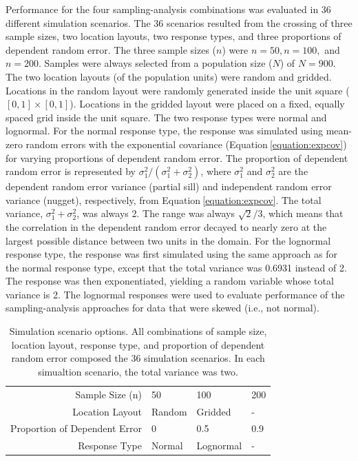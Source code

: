 \documentclass[]{elsarticle} %
\begin{document}
Performance for the four sampling-analysis combinations was evaluated in
36 different simulation scenarios. The 36 scenarios resulted from the
crossing of three sample sizes, two location layouts, two response
types, and three proportions of dependent random error. The three sample
sizes (\(n\)) were \(n = 50, n = 100,\) and \(n = 200\). Samples were
always selected from a population size (\(N\)) of \(N = 900\). The two
location layouts (of the population units) were random and gridded.
Locations in the random layout were randomly generated inside the unit
square (\([0, 1] \times [0, 1]\)). Locations in the gridded layout were
placed on a fixed, equally spaced grid inside the unit square. The two
response types were normal and lognormal. For the normal response type,
the response was simulated using mean-zero random errors with the
exponential covariance (Equation\(~\)\ref{equation:expcov}) for varying
proportions of dependent random error. The proportion of dependent
random error is represented by
\(\sigma^2_1 / (\sigma^2_1 + \sigma^2_2)\), where \(\sigma^2_1\) and
\(\sigma^2_2\) are the dependent random error variance (partial sill)
and independent random error variance (nugget), respectively, from
Equation\(~\)\ref{equation:expcov}. The total variance,
\(\sigma^2_1 + \sigma^2_2\), was always 2. The range was always
\(\sqrt{2} / 3\), which means that the correlation in the dependent
random error decayed to nearly zero at the largest possible distance
between two units in the domain. For the lognormal response type, the
response was first simulated using the same approach as for the normal
response type, except that the total variance was 0.6931 instead of 2.
The response was then exponentiated, yielding a random variable whose
total variance is 2. The lognormal responses were used to evaluate
performance of the sampling-analysis approaches for data that were
skewed (i.e., not normal).

\begin{table}[ht]
\centering
\begin{tabular}{r|lll}
   \hline
Sample Size (n) & 50 & 100 & 200 \\ 
  Location Layout & Random & Gridded & - \\ 
  Proportion of Dependent Error & 0 & 0.5 & 0.9 \\ 
  Response Type & Normal & Lognormal & - \\ 
   \hline
\end{tabular}
\caption{\label{tab:parmtab} Simulation scenario options. All combinations of sample size, location layout, response type, and proportion of dependent random error composed the 36 simulation scenarios. In each simualtion scenario, the total variance was two.} 
\end{table}
\end{document}

